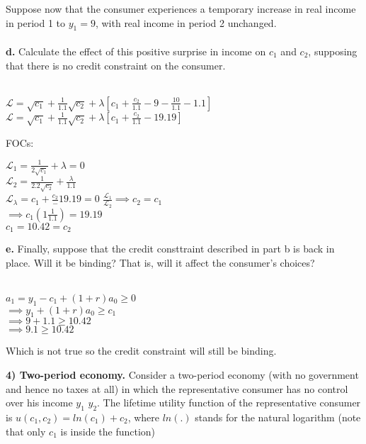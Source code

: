 \documentclass[11pt]{SelfArxOneColBMN}
\begin{document}
\noindent Suppose now that the consumer experiences a temporary increase in real income in period 1 to $y_1 = 9$, with real income in period 2 unchanged.\\
\\
\indent \textbf{d.} Calculate the effect of this positive surprise in income on $c_1$ and $c_2$, supposing that there is no credit constraint on the consumer.\\
\\
\begin{solution}
  \begin{center}
    $\mathcal{L} = \sqrt{c_1} + \frac{1}{1.1}\sqrt{c_2} + \lambda[c_1 + \frac{c_2}{1.1} - 9 - \frac{10}{1.1} - 1.1]$\\
    $\mathcal{L} = \sqrt{c_1} + \frac{1}{1.1}\sqrt{c_2} + \lambda[c_1 + \frac{c_2}{1.1} - 19.19]$\\
  \end{center}
  FOCs:
  \begin{center}
    $\mathcal{L}_1 = \frac{1}{2\sqrt{c_1}} + \lambda = 0$\\
    $\mathcal{L}_2 = \frac{1}{2.2\sqrt{c_2}} + \frac{\lambda}{1.1}$\\
    $\mathcal{L}_\lambda = c_1 + \frac{c_2} - 19.19 = 0$
    $\frac{\mathcal{L}_1}{\mathcal{L}_2} \implies c_2 = c_1$\\
    $\implies c_1(1 \frac{1}{1.1}) = 19.19$\\
    $c_1 = 10.42 = c_2$
  \end{center}
\end{solution}
\indent \textbf{e.} Finally, suppose that the credit consttraint described in part b is back in place. Will it be binding? That is, will it affect the consumer's choices?\\
\\
\begin{solution}
  \begin{center}
    $a_1 = y_1 - c_1 + (1 + r)a_0 \geq 0$\\
    $\implies y_1 + (1 + r)a_0 \geq c_1$\\
    $\implies 9 + 1.1 \geq 10.42$\\
    $\implies 9.1 \geq 10.42$
  \end{center}
  \noindent Which is not true so the credit constraint will still be binding. 
\end{solution}
\textbf{4) Two-period economy.} Consider a two-period economy (with no government and hence no taxes at all) in which the representative consumer has no control over his income $y_1$ $y_2$. The lifetime utility function of the representative consumer is $u(c_1,c_2) = ln(c_1) + c_2$, where $ln(.)$ stands for the natural logarithm (note that only $c_1$ is inside the function)\\
\end{document}
